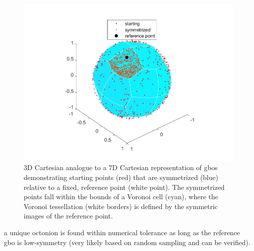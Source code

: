 \documentclass[preprint,12pt]{elsarticle}
\begin{document}
\begin{figure}
    \centering
    \includegraphics{voronoi.png}
    \caption{3D Cartesian analogue to a 7D Cartesian representation of \glspl{gbo} demonstrating starting points (red) that are symmetrized (blue) relative to a fixed, reference point (white point). The symmetrized points fall within the bounds of a Voronoi cell (cyan), where the Voronoi tessellation (white borders) is defined by the symmetric images of the reference point.}
    \label{fig:voronoi}
\end{figure}

a unique octonion is found within numerical tolerance as long as the reference \gls{gbo} is low-symmetry (very likely based on random sampling and can be verified).
\end{document}
